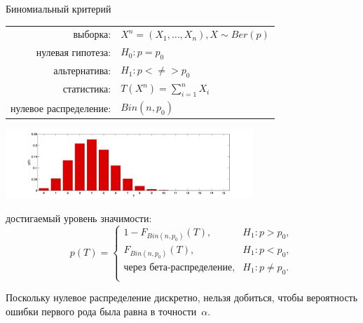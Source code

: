 \documentclass[9pt,pdf,utf8,hyperref={unicode},aspectratio=169]{beamer}
\begin{document}
\begin{frame}{Биномиальный критерий}
	\begin{center}
		\begin{tabular}{rl}
			выборка:                        & $X^{n}=\left(X_{1},\ldots,X_{n}\right), X \sim Ber\left(p\right)$ \\
			нулевая гипотеза:               & $H_0\colon p=p_0$ \\
			альтернатива:                   & $H_1\colon p<\neq>p_0$ \\
			статистика:                     & $T\left(X^{n}\right) = \sum\limits_{i=1}^n X_i$ \\
			нулевое распределение:          & $Bin(n,p_0)$\\
		\end{tabular}
		\includegraphics[width=0.7\textwidth]{bin_nonsym.png}
	\end{center}
	
	\vspace{-5pt}
	
	достигаемый уровень значимости:
	$$p\left(T\right) = \begin{cases}
	1-F_{Bin(n,p_0)}(T), & H_1 \colon p>p_0, \\
	F_{Bin(n,p_0)}(T),   & H_1 \colon p<p_0, \\
	\text{через бета-распределение},       & H_1 \colon p\neq p_0. \\
	\end{cases}
	$$
	
	\vspace{-5pt}
	
	Поскольку нулевое распределение дискретно, нельзя добиться, чтобы вероятность ошибки первого рода была равна в точности~$\alpha$. 
\end{frame}
\end{document}
